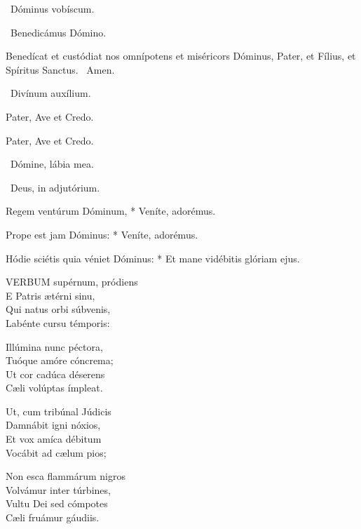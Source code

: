 \V\ Dóminus vobíscum.

\V\ Benedicámus Dómino.

 Benedícat et custódiat nos omnípotens et miséricors Dóminus, Pater, et Fílius, et Spíritus Sanctus. \R\ Amen.


\V\ Divínum auxílium.

Pater, Ave et Credo.

\sectionornament



Pater, Ave et Credo.

\V\ Dómine, lábia mea.

\V\ Deus, in adjutórium.



 Regem ventúrum Dóminum, * Veníte, adorémus.


 Prope est jam Dóminus: * Veníte, adorémus.


 Hódie sciétis quia véniet Dóminus: * Et mane vidébitis glóriam ejus.


\lettrine[lines=2]{V}{ERBUM} supérnum, pródiens\\
E Patris ætérni sinu,\\
Qui natus orbi súbvenis,\\
Labénte cursu témporis:

Illúmina nunc péctora,\\
Tuóque amóre cóncrema;\\
Ut cor cadúca déserens\\
Cæli volúptas ímpleat.

Ut, cum tribúnal Júdicis\\
Damnábit igni nóxios,\\
Et vox amíca débitum\\
Vocábit ad cælum pios;

Non esca flammárum nigros\\
Volvámur inter túrbines,\\
Vultu Dei sed cómpotes\\
Cæli fruámur gáudiis.

